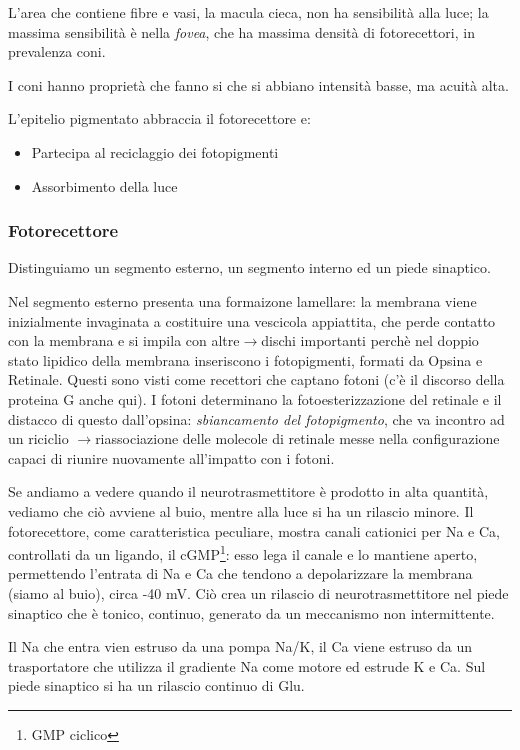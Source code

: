 \documentclass[a4paper,12pt]{article}
\newcommand{\lfreccia}{\ensuremath{\longrightarrow}}
\begin{document}
L'area che contiene fibre e vasi, la macula cieca, non ha sensibilità alla luce; la massima sensibilità è nella \emph{fovea}, che ha massima densità di fotorecettori, in prevalenza coni.

I coni hanno proprietà che fanno si che si abbiano intensità basse, ma acuità alta.

L'epitelio pigmentato abbraccia il fotorecettore e:
\begin{itemize}
\item{Partecipa al reciclaggio dei fotopigmenti}
\item{Assorbimento della luce}
\end{itemize}

\subsubsection{Fotorecettore}
Distinguiamo un segmento esterno, un segmento interno ed un piede sinaptico.

Nel segmento esterno presenta una formaizone lamellare: la membrana viene inizialmente invaginata a costituire una vescicola appiattita, che perde contatto con la membrana e si impila con altre\lfreccia dischi  importanti perchè nel doppio stato lipidico della membrana inseriscono i fotopigmenti, formati da Opsina e Retinale. Questi sono visti come recettori che captano fotoni (c'è il discorso della proteina G anche qui). I fotoni determinano la fotoesterizzazione del retinale e il distacco di questo dall'opsina: \emph{sbiancamento del fotopigmento}, che va incontro ad un riciclio \lfreccia riassociazione delle molecole di retinale messe nella configurazione capaci di riunire nuovamente all'impatto con i fotoni.

Se andiamo a vedere quando il neurotrasmettitore è prodotto in alta quantità, vediamo che ciò avviene al buio, mentre alla luce si ha un rilascio minore. Il fotorecettore, come caratteristica peculiare, mostra canali cationici per Na e Ca, controllati da un ligando, il cGMP\footnote{GMP ciclico}: esso lega il canale e lo mantiene aperto, permettendo l'entrata di Na e Ca che tendono a depolarizzare la membrana (siamo al buio), circa -40 mV. Ciò crea un rilascio di neurotrasmettitore nel piede sinaptico che è tonico, continuo, generato da un meccanismo non intermittente. 

Il Na che entra vien estruso da una pompa Na/K, il Ca viene estruso da un trasportatore che utilizza il gradiente Na come motore ed estrude K e Ca. Sul piede sinaptico si ha un rilascio continuo di Glu.  
\end{document}

